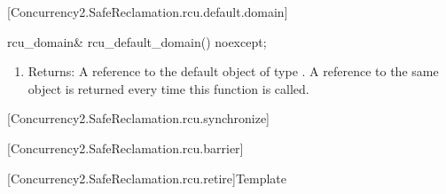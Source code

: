[Concurrency2.SafeReclamation.rcu.default.domain]{}

\begin{codeblock}
   rcu_domain& rcu_default_domain() noexcept;
\end{codeblock}

\begin{enumerate}
\item	Returns: A reference to the default object of type .
	A reference to the same object is returned every time this
	function is called.
\end{enumerate}

[Concurrency2.SafeReclamation.rcu.synchronize]{}

[Concurrency2.SafeReclamation.rcu.barrier]{}

[Concurrency2.SafeReclamation.rcu.retire]{Template }
